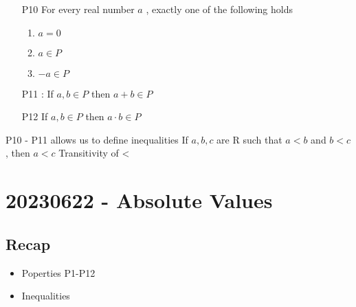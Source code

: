 \documentclass{report}
\begin{document}
\begin{enumerate}
\begin{proof}
\begin{case}
        \end{case}
      \end{proof}

    \underline{3 Properties of Positive Numbers}
    \item[P10] For every real number $a$ , exactly one of the following
      holds
      \begin{enumerate}
        \item $a=0$
        \item $a \in P$
        \item $-a \in P$
      \end{enumerate}
    \item[P11]: If $a,b \in P$ then $a+b \in P$
    \item[P12] If $a,b \in P$ then $a \cdot b \in P$
  \end{enumerate}

  P10 - P11 allows us to define inequalities
   {
    If $a,b,c$ are R such that $a < b$ and $b < c$, then $a < c$
    Transitivity of <
  }





\section*{20230622 - Absolute Values}%
  \subsection*{Recap}
    \begin{itemize}
      \item Poperties P1-P12
      \item Inequalities
    \end{itemize}
\end{document}
